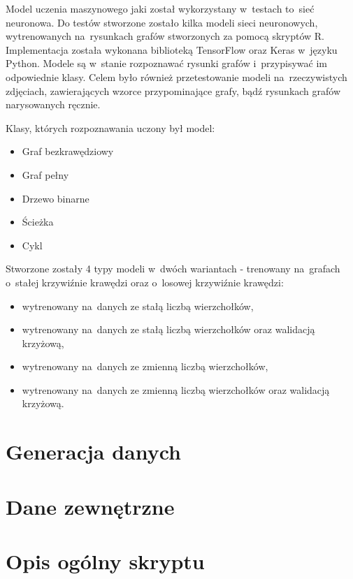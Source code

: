 Model uczenia maszynowego jaki został wykorzystany w~testach to~sieć neuronowa.
Do testów stworzone zostało kilka modeli sieci neuronowych,
wytrenowanych na~rysunkach grafów stworzonych za pomocą skryptów R.
Implementacja została wykonana biblioteką TensorFlow oraz Keras w~języku Python.
Modele są w~stanie rozpoznawać rysunki grafów i~przypisywać im odpowiednie klasy.
Celem było również przetestowanie modeli na~rzeczywistych zdjęciach,
zawierających wzorce przypominające grafy, bądź rysunkach grafów narysowanych ręcznie.

Klasy, których rozpoznawania uczony był model:
\begin{itemize}[label=-,labelsep=0.4cm,leftmargin=0.6cm]
	\item Graf bezkrawędziowy
	\item Graf pełny
	\item Drzewo binarne
	\item Ścieżka
	\item Cykl
\end{itemize}

Stworzone zostały 4 typy modeli w~dwóch wariantach - trenowany na~grafach o~stałej krzywiźnie krawędzi oraz o~losowej krzywiźnie krawędzi:
\begin{itemize}[label=-,labelsep=0.4cm,leftmargin=0.6cm]
	\item wytrenowany na~danych ze stałą liczbą wierzchołków,
	\item wytrenowany na~danych ze stałą liczbą wierzchołków oraz walidacją krzyżową,
	\item wytrenowany na~danych ze zmienną liczbą wierzchołków,
	\item wytrenowany na~danych ze zmienną liczbą wierzchołków oraz walidacją krzyżową.
\end{itemize}

\section{Generacja danych}


\section{Dane zewnętrzne}


\section{Opis ogólny skryptu}
